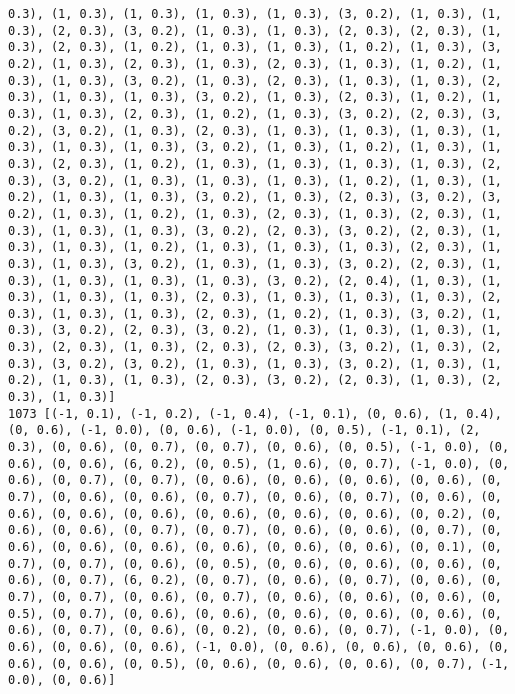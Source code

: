 \documentclass[11pt]{article}
\begin{document}
\begin{Verbatim}[commandchars=\\\{\}]
0.3), (1, 0.3), (1, 0.3), (1, 0.3), (1, 0.3), (3, 0.2), (1, 0.3), (1, 0.3), (2, 0.3), (3, 0.2), (1, 0.3), (1, 0.3), (2, 0.3), (2, 0.3), (1, 0.3), (2, 0.3), (1, 0.2), (1, 0.3), (1, 0.3), (1, 0.2), (1, 0.3), (3, 0.2), (1, 0.3), (2, 0.3), (1, 0.3), (2, 0.3), (1, 0.3), (1, 0.2), (1, 0.3), (1, 0.3), (3, 0.2), (1, 0.3), (2, 0.3), (1, 0.3), (1, 0.3), (2, 0.3), (1, 0.3), (1, 0.3), (3, 0.2), (1, 0.3), (2, 0.3), (1, 0.2), (1, 0.3), (1, 0.3), (2, 0.3), (1, 0.2), (1, 0.3), (3, 0.2), (2, 0.3), (3, 0.2), (3, 0.2), (1, 0.3), (2, 0.3), (1, 0.3), (1, 0.3), (1, 0.3), (1, 0.3), (1, 0.3), (1, 0.3), (3, 0.2), (1, 0.3), (1, 0.2), (1, 0.3), (1, 0.3), (2, 0.3), (1, 0.2), (1, 0.3), (1, 0.3), (1, 0.3), (1, 0.3), (2, 0.3), (3, 0.2), (1, 0.3), (1, 0.3), (1, 0.3), (1, 0.2), (1, 0.3), (1, 0.2), (1, 0.3), (1, 0.3), (3, 0.2), (1, 0.3), (2, 0.3), (3, 0.2), (3, 0.2), (1, 0.3), (1, 0.2), (1, 0.3), (2, 0.3), (1, 0.3), (2, 0.3), (1, 0.3), (1, 0.3), (1, 0.3), (3, 0.2), (2, 0.3), (3, 0.2), (2, 0.3), (1, 0.3), (1, 0.3), (1, 0.2), (1, 0.3), (1, 0.3), (1, 0.3), (2, 0.3), (1, 0.3), (1, 0.3), (3, 0.2), (1, 0.3), (1, 0.3), (3, 0.2), (2, 0.3), (1, 0.3), (1, 0.3), (1, 0.3), (1, 0.3), (3, 0.2), (2, 0.4), (1, 0.3), (1, 0.3), (1, 0.3), (1, 0.3), (2, 0.3), (1, 0.3), (1, 0.3), (1, 0.3), (2, 0.3), (1, 0.3), (1, 0.3), (2, 0.3), (1, 0.2), (1, 0.3), (3, 0.2), (1, 0.3), (3, 0.2), (2, 0.3), (3, 0.2), (1, 0.3), (1, 0.3), (1, 0.3), (1, 0.3), (2, 0.3), (1, 0.3), (2, 0.3), (2, 0.3), (3, 0.2), (1, 0.3), (2, 0.3), (3, 0.2), (3, 0.2), (1, 0.3), (1, 0.3), (3, 0.2), (1, 0.3), (1, 0.2), (1, 0.3), (1, 0.3), (2, 0.3), (3, 0.2), (2, 0.3), (1, 0.3), (2, 0.3), (1, 0.3)]
1073 [(-1, 0.1), (-1, 0.2), (-1, 0.4), (-1, 0.1), (0, 0.6), (1, 0.4), (0, 0.6), (-1, 0.0), (0, 0.6), (-1, 0.0), (0, 0.5), (-1, 0.1), (2, 0.3), (0, 0.6), (0, 0.7), (0, 0.7), (0, 0.6), (0, 0.5), (-1, 0.0), (0, 0.6), (0, 0.6), (6, 0.2), (0, 0.5), (1, 0.6), (0, 0.7), (-1, 0.0), (0, 0.6), (0, 0.7), (0, 0.7), (0, 0.6), (0, 0.6), (0, 0.6), (0, 0.6), (0, 0.7), (0, 0.6), (0, 0.6), (0, 0.7), (0, 0.6), (0, 0.7), (0, 0.6), (0, 0.6), (0, 0.6), (0, 0.6), (0, 0.6), (0, 0.6), (0, 0.6), (0, 0.2), (0, 0.6), (0, 0.6), (0, 0.7), (0, 0.7), (0, 0.6), (0, 0.6), (0, 0.7), (0, 0.6), (0, 0.6), (0, 0.6), (0, 0.6), (0, 0.6), (0, 0.6), (0, 0.1), (0, 0.7), (0, 0.7), (0, 0.6), (0, 0.5), (0, 0.6), (0, 0.6), (0, 0.6), (0, 0.6), (0, 0.7), (6, 0.2), (0, 0.7), (0, 0.6), (0, 0.7), (0, 0.6), (0, 0.7), (0, 0.7), (0, 0.6), (0, 0.7), (0, 0.6), (0, 0.6), (0, 0.6), (0, 0.5), (0, 0.7), (0, 0.6), (0, 0.6), (0, 0.6), (0, 0.6), (0, 0.6), (0, 0.6), (0, 0.7), (0, 0.6), (0, 0.2), (0, 0.6), (0, 0.7), (-1, 0.0), (0, 0.6), (0, 0.6), (0, 0.6), (-1, 0.0), (0, 0.6), (0, 0.6), (0, 0.6), (0, 0.6), (0, 0.6), (0, 0.5), (0, 0.6), (0, 0.6), (0, 0.6), (0, 0.7), (-1, 0.0), (0, 0.6)]

\end{Verbatim}
\end{document}
